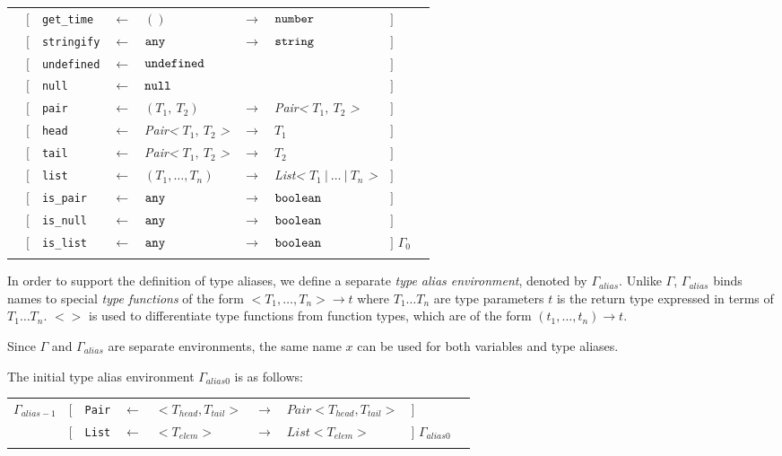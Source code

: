 \begin{tabular}[fragile]{lllllllll}
& $[$ & \texttt{get\_time} & $\leftarrow$  & $()$ & $\rightarrow$ & $\texttt{number}$ & $]$ \\
& $[$ & \texttt{stringify} & $\leftarrow$  & $\texttt{any}$ & $\rightarrow$ & $\texttt{string}$ & $]$ \\
& $[$ & \texttt{undefined} & $\leftarrow$  & $\texttt{undefined}$ & & & $]$ \\
& $[$ & \texttt{null}      & $\leftarrow$  & $\texttt{null}$ & & & $]$ \\
& $[$ & \texttt{pair} & $\leftarrow$  & $(T_1,\ T_2)$ & $\rightarrow$ & \textit{Pair<} $T_1,\ T_2$ \textit{>} & $]$ \\
& $[$ & \texttt{head} & $\leftarrow$  & \textit{Pair<} $T_1,\ T_2$ \textit{>} & $\rightarrow$ & $T_1$ & $]$ \\
& $[$ & \texttt{tail} & $\leftarrow$  & \textit{Pair<} $T_1,\ T_2$ \textit{>} & $\rightarrow$ & $T_2$ & $]$ \\
& $[$ & \texttt{list} & $\leftarrow$  & $(T_1, \ldots, T_n)$ & $\rightarrow$ & \textit{List<} $T_1\ |\ \ldots\ |\ T_n$ \textit{>} & $]$ \\
& $[$ & \texttt{is\_pair} & $\leftarrow$  & $\texttt{any}$ & $\rightarrow$ & $\texttt{boolean}$ & $]$ \\
& $[$ & \texttt{is\_null} & $\leftarrow$  & $\texttt{any}$ & $\rightarrow$ & $\texttt{boolean}$ & $]$ \\
& $[$ & \texttt{is\_list} & $\leftarrow$  & $\texttt{any}$ & $\rightarrow$ & $\texttt{boolean}$ & $]$ $\Gamma_0$ \\
& \end{tabular}

In order to support the definition of type aliases, we define a separate
\emph{type alias environment}, denoted by $\Gamma_{alias}$. Unlike $\Gamma$,
$\Gamma_{alias}$ binds names to special \emph{type functions} of the form $<T_1, \ldots, T_n> \rightarrow t$
where $T_1 \ldots T_n$ are type parameters $t$ is the return type expressed in terms of $T_1 \ldots T_n$.
$<>$ is used to differentiate type functions from function types, which are of the form $(t_1, \ldots, t_n) \rightarrow t$.

Since $\Gamma$ and $\Gamma_{alias}$ are separate environments, the same name $x$ can be used for both variables and type aliases.

The initial type alias environment $\Gamma_{alias0}$ is as follows:

\begin{tabular}[fragile]{lllllllll}
$\Gamma_{alias-1}$
& $[$ & \texttt{Pair} & $\leftarrow$ & $<T_{head}, T_{tail}>$ & $\rightarrow$ & $Pair<T_{head}, T_{tail}>$ & $]$ \\
& $[$ & \texttt{List} & $\leftarrow$ & $<T_{elem}>$ & $\rightarrow$ & $List<T_{elem}>$ & $]$ $\Gamma_{alias0}$ \\
& \end{tabular}

